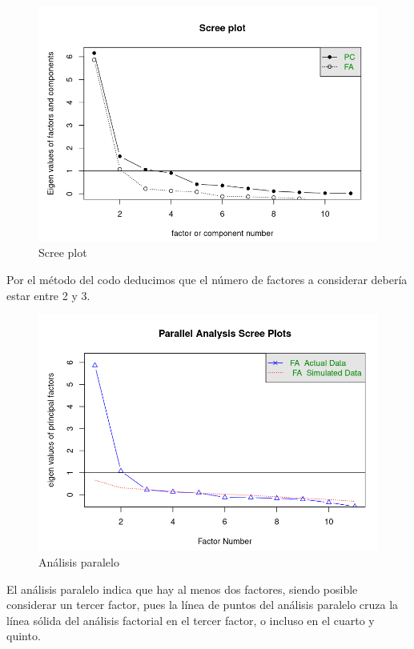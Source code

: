 \documentclass[11pt,a4paper]{article}
\begin{document}
    \begin{figure}[H]
    	    \centering
    	    \includegraphics[scale=0.5]{screeplot2.png}
    	    \caption{Scree plot}
    	    \label{plot2}
    	\end{figure}
    	
    Por el método del codo deducimos que el número de factores a considerar debería estar entre 2 y 3. 
             \begin{figure}[H]
    	    \centering
    	    \includegraphics[scale=0.5]{parallel analysis.png}
    	    \caption{Análisis paralelo}
    	    \label{plot3}
    	\end{figure}
    	
    El análisis paralelo indica que hay al menos dos factores, siendo posible considerar un tercer factor, pues la línea de puntos del análisis paralelo cruza la línea sólida del análisis factorial en el tercer factor, o incluso en el cuarto y quinto.
    
\end{document}
